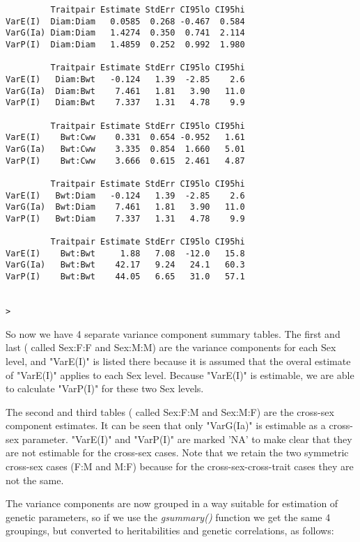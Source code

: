 \documentclass[titlepage]{article}  %
\begin{document}
\begin{verbatim}
         Traitpair Estimate StdErr CI95lo CI95hi
VarE(I)  Diam:Diam   0.0585  0.268 -0.467  0.584
VarG(Ia) Diam:Diam   1.4274  0.350  0.741  2.114
VarP(I)  Diam:Diam   1.4859  0.252  0.992  1.980

         Traitpair Estimate StdErr CI95lo CI95hi
VarE(I)   Diam:Bwt   -0.124   1.39  -2.85    2.6
VarG(Ia)  Diam:Bwt    7.461   1.81   3.90   11.0
VarP(I)   Diam:Bwt    7.337   1.31   4.78    9.9

         Traitpair Estimate StdErr CI95lo CI95hi
VarE(I)    Bwt:Cww    0.331  0.654 -0.952   1.61
VarG(Ia)   Bwt:Cww    3.335  0.854  1.660   5.01
VarP(I)    Bwt:Cww    3.666  0.615  2.461   4.87

         Traitpair Estimate StdErr CI95lo CI95hi
VarE(I)   Bwt:Diam   -0.124   1.39  -2.85    2.6
VarG(Ia)  Bwt:Diam    7.461   1.81   3.90   11.0
VarP(I)   Bwt:Diam    7.337   1.31   4.78    9.9

         Traitpair Estimate StdErr CI95lo CI95hi
VarE(I)    Bwt:Bwt     1.88   7.08  -12.0   15.8
VarG(Ia)   Bwt:Bwt    42.17   9.24   24.1   60.3
VarP(I)    Bwt:Bwt    44.05   6.65   31.0   57.1


> 
\end{verbatim} 
 So now we have 4 separate variance component summary tables. The first and last ( called Sex:F:F and Sex:M:M) are the variance components for each Sex level, and "VarE(I)" is listed there because it is assumed that the overal estimate of "VarE(I)" applies to each Sex level. Because "VarE(I)" is estimable, we are able to calculate "VarP(I)" for these two Sex levels. 

The second and third tables ( called Sex:F:M and Sex:M:F) are the cross-sex component estimates. It can be seen that only "VarG(Ia)" is estimable as a cross-sex parameter. "VarE(I)" and "VarP(I)" are marked 'NA' to make clear that they are not estimable for the cross-sex cases. Note that we retain the two symmetric cross-sex cases (F:M and M:F) because for the cross-sex-cross-trait cases they are not the same.

The variance components are now grouped in a way suitable for estimation of genetic parameters, so if we use the {\em gsummary()} function we get the same 4 groupings, but converted to heritabilities and genetic correlations, as follows:
\end{document}

